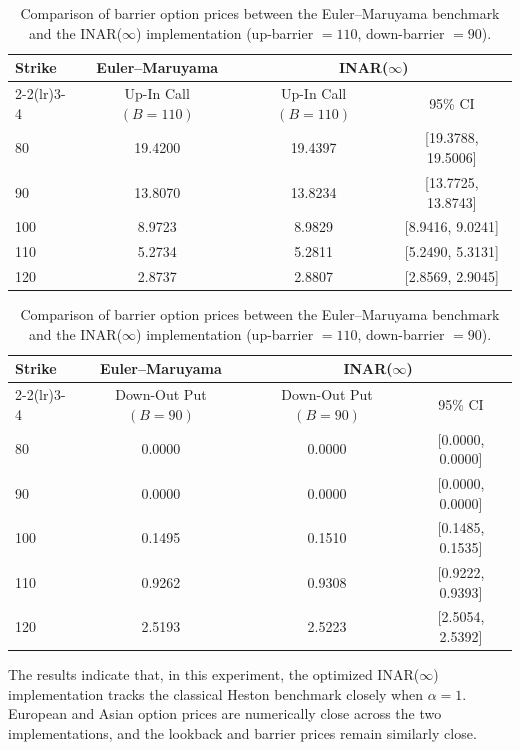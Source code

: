 \documentclass[letterpaper]{article}
\numberwithin{equation}{section}
\theoremstyle{definition}
\theoremstyle{remark}
\begin{document}
\begin{table}[htb]
  \centering
  \caption{Comparison of barrier option prices between the Euler--Maruyama benchmark and the INAR($\infty$) implementation (up-barrier $=110$, down-barrier $=90$).}
  \small
  \setlength{\tabcolsep}{5pt}
  \begin{tabular*}{\textwidth}{@{\extracolsep{\fill}}lccc@{}}
  \toprule
  \multirow{2}{*}{Strike} & \multicolumn{1}{c}{Euler--Maruyama} & \multicolumn{2}{c}{INAR($\infty$)} \\
  \cmidrule(lr){2-2}\cmidrule(lr){3-4}
   & Up-In Call $\left(B=110\right)$ & Up-In Call $\left(B=110\right)$ & 95\% CI \\
  \midrule
  80  & 19.4200 & 19.4397 & [19.3788, 19.5006] \\
  90  & 13.8070 & 13.8234 & [13.7725, 13.8743] \\
  100 & 8.9723  & 8.9829  & [8.9416, 9.0241] \\
  110 & 5.2734  & 5.2811  & [5.2490, 5.3131] \\
  120 & 2.8737  & 2.8807  & [2.8569, 2.9045] \\
  \bottomrule
  \end{tabular*}
  \vspace{0.3cm}

  \begin{tabular*}{\textwidth}{@{\extracolsep{\fill}}lccc@{}}
  \toprule
  \multirow{2}{*}{Strike} & \multicolumn{1}{c}{Euler--Maruyama} & \multicolumn{2}{c}{INAR($\infty$)} \\
  \cmidrule(lr){2-2}\cmidrule(lr){3-4}
   & Down-Out Put $\left(B=90\right)$ & Down-Out Put $\left(B=90\right)$ & 95\% CI \\
  \midrule
  80  & 0.0000 & 0.0000 & [0.0000, 0.0000] \\
  90  & 0.0000 & 0.0000 & [0.0000, 0.0000] \\
  100 & 0.1495  & 0.1510  & [0.1485, 0.1535] \\
  110 & 0.9262  & 0.9308  & [0.9222, 0.9393] \\
  120 & 2.5193  & 2.5223  & [2.5054, 2.5392] \\
  \bottomrule
  \end{tabular*}
  \label{tab:barrier_comparison}
\end{table}

The results indicate that, in this experiment, the optimized INAR($\infty$)
implementation tracks the classical Heston benchmark closely when $\alpha=1$.
European and Asian option prices are numerically close across the two
implementations, and the lookback and barrier prices remain similarly close.
\end{document}
